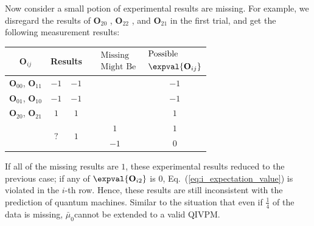 \documentclass[english,reprint, aps, prl,superscriptaddress, showpacs,
showkeys, longbibliography, amsmath, amssymb, floatfix]{revtex4-1}
\theoremstyle{plain}
\theoremstyle{definition}
\newcommand{\missing}{?}
\begin{document}
Now consider a small potion of experimental results are missing. For
example, we disregard the results of $\mathbf{O}_{20}$ , $\mathbf{O}_{22}$
, and $\mathbf{O}_{21}$ in the first trial, and get the following
measurement results:
\begin{center}
\begin{tabular}{ccccc}
\toprule 
\addlinespace
$\mathbf{O}_{ij}$  & \multicolumn{2}{c}{Results} & $\begin{aligned} & \textrm{Missing}\\
 & \textrm{Might Be}
\end{aligned}
$  & $\begin{aligned} & \textrm{Possible}\\
 & \expval{\mathbf{O}_{ij}}
\end{aligned}
$\tabularnewline
\midrule
\midrule 
\addlinespace
$\mathbf{O}_{00}$, $\mathbf{O}_{11}$ & $-1$  & $-1$ &  & $-1$\tabularnewline
\midrule 
\addlinespace
$\mathbf{O}_{01}$, $\mathbf{O}_{10}$ & $-1$  & $-1$  &  & $-1$\tabularnewline
\midrule 
\addlinespace
$\mathbf{O}_{20}$, $\mathbf{O}_{21}$ & $1$  & $1$  &  & $1$\tabularnewline
\midrule 
\addlinespace
\multirow{2}{*}{$\mathbf{O}_{02}$, $\mathbf{O}_{12}$, $\mathbf{O}_{22}$} & \multirow{2}{*}{$\missing$} & \multirow{2}{*}{$1$} & $1$ & $1$\tabularnewline
\cmidrule{4-5} 
\addlinespace
 &  &  & $-1$ & $0$\tabularnewline
\bottomrule
\end{tabular}
\par\end{center}

\noindent If all of the missing results are $1$, these experimental
results reduced to the previous case; if any of $\expval{\mathbf{O}_{i2}}$
is $0$, Eq.~(\ref{eq:i_expectation_value}) is violated in the $i$-th
row. Hence, these results are still inconsistent with the prediction
of quantum machines. Similar to the situation that even if $\frac{1}{4}$
of the data is missing, $\bar{\mu}_{0}$cannot be extended to a valid
QIVPM.
\end{document}
